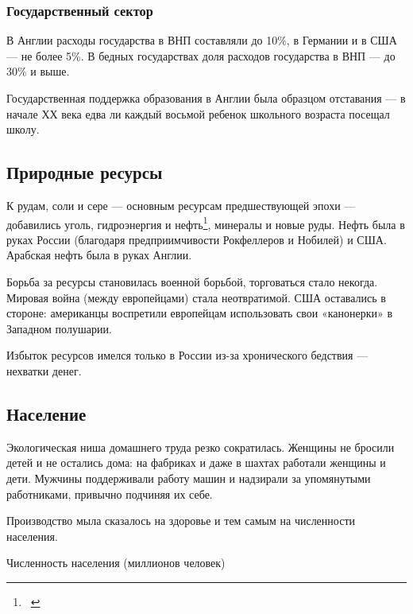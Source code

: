 \documentclass[a4paper]{article}
\begin{document}
\subsubsection[Государственный сектор]{\rmfamily\bfseries Государственный сектор}
{
В Англии расходы государства в ВНП составляли до 10\%, в Германии и в США — не более 5\%. В бедных государствах доля
расходов государства в ВНП — до 30\% и выше. }

{
Государственная поддержка образования в Англии была образцом отставания — в начале ХХ века едва ли каждый восьмой
ребенок школьного возраста посещал школу.}

\subsection[Природные ресурсы ]{\textrm{Природные ресурсы }}
{
К рудам, соли и сере — основным ресурсам предшествующей эпохи — добавились уголь, гидроэнергия и
нефть\footnote{\ }, минералы и новые руды. Нефть была в
руках России (благодаря предприимчивости Рокфеллеров и Нобилей) и США. Арабская нефть была в руках Англии. }

{
Борьба за ресурсы становилась военной борьбой, торговаться стало некогда. Мировая война (между европейцами) стала
неотвратимой. США оставались в стороне: американцы воспретили европейцам использовать свои «канонерки» в Западном
полушарии. }

{
Избыток ресурсов имелся только в России из-за хронического бедствия — нехватки денег.}

\subsection[Население ]{\textrm{Население }}
{
Экологическая ниша домашнего труда резко сократилась. Женщины не бросили детей и не остались дома: на фабриках и даже в
шахтах работали женщины и дети. Мужчины поддерживали работу машин и надзирали за упомянутыми работниками, привычно
подчиняя их себе.}

{
Производство мыла сказалось на здоровье и тем самым на численности населения.}

{\centering{}
Численность населения (миллионов человек)
\par}
\end{document}
